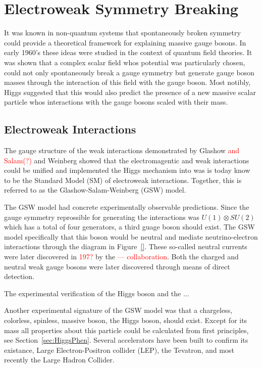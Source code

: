 \section{Electroweak Symmetry Breaking}
\label{sec:Electroweak Symmetry Breaking}

It was known in non-quantum systems that spontaneously broken symmetry
could provide a theoretical framework for explaining massive gauge 
bosons\cite{}. In early 1960's these ideas were studied in the context
of quantum field theories.  It was shown that a complex scalar field 
whos potential was particularly chosen, could not only spontaneously 
break a gauge symmetry but generate gauge boson masses through the 
interaction of this field with the gauge boson\cite{}.  Most notibly, 
Higgs suggested that this would also predict the presence of a new 
massive scalar particle whos interactions with the gauge bosons 
scaled with their mass\cite{}.  

\subsection{Electroweak Interactions}
\label{sec:Electroweak interactions}

The gauge structure of the weak interactions demonstrated by Glashow 
\textcolor{red}{and Salam(?)}\cite{} and Weinberg showed that the 
electromagentic and weak interactions could be unified and implemented
the Higgs mechanism into was is today know to be the Standard Model (SM)
of electroweak interactions.  Together, this is referred to as the 
Glashow-Salam-Weinberg (GSW) model.

The GSW model had concrete experimentally observable predictions.  Since
the gauge symmetry reprossible for generating the interactions was
$U(1)\otimes SU(2)$ which has a total of four generators, a third guage 
boson should exist.  The GSW model specifically that this boson would 
be neutral and mediate neutrino-electron interactions through the 
diagram in Figure~\ref{}.  These so-called neutral currents were later
discovered in \textcolor{red}{197?} by the \textcolor{red}{--- collaboration}.
Both the charged and neutral weak gauge bosons were later discovered
through means of direct detection\cite{}.  

The experimental verification of the Higgs boson and the ...

Another experimental signature of the GSW model was that a chargeless,
colorless, spinless, massive boson, the Higgs boson, should exist.  
Except for its mass all properties about this particle could be calculated
from first principles, see Section~\ref{sec:HiggsPhen}.  Several accelerators
have been built to confirm its existance, Large Electron-Positron collider (LEP), 
the Tevatron, and most recently the Large Hadron Collider.  

